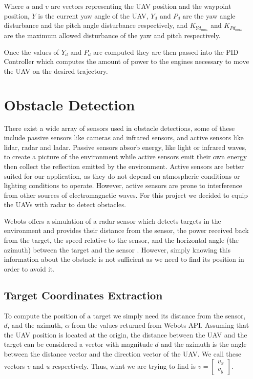 Where $u$ and $v$ are vectors representing the UAV position and the waypoint position, $Y$ is the current 
yaw angle of the UAV, $Y_d$ and $P_d$ are the yaw angle disturbance and the pitch angle disturbance
respectively, and $K_{Yd_{max}}$ and $K_{Pd_{max}}$ are the maximum allowed disturbance of the yaw and 
pitch respectively.

Once the values of $Y_d$ and $P_d$ are computed they are then passed into the PID Controller which computes
the amount of power to the engines necessary to move the UAV on the desired trajectory.

\section{Obstacle Detection}

There exist a wide array of sensors used in obstacle detections, some of these include passive
sensors like cameras and infrared sensors, and active sensors like lidar, radar and ladar. 
Passive sensors absorb energy, like light or infrared waves, to create a picture of the 
environment while active sensors emit their own energy then collect the reflection emitted
by the environment. Active sensors are better suited for our application, as they do not
depend on atmospheric conditions or lighting conditions to operate. However, active sensors
are prone to interference from other sources of electromagnetic waves. \autocite{4432828}
For this project we decided to equip the UAVs with radar to detect obstacles. 

Webots offers a simulation of a radar sensor which detects targets in the environment and 
provides their distance from the sensor, the power received back from the target, the speed relative 
to the sensor, and the horizontal angle (the azimuth) between the target and the sensor \autocite{Webots}.
However, simply knowing this information about the obstacle is not sufficient as we need to find
its position in order to avoid it.

\subsection{Target Coordinates Extraction}

To compute the position of a target we simply need its distance from the sensor, $d$, and the azimuth, 
$\alpha$ from the values returned from Webots API. Assuming that the UAV position is located at the origin,
the distance between the UAV and the target can be considered a vector with magnitude $d$ and the 
azimuth is the angle between the distance vector and the direction vector of the UAV. We call these
vectors $v$ and $u$ respectively. Thus, what we are trying to find is $v = \begin{bmatrix} v_x \\ v_y \end{bmatrix}$.

